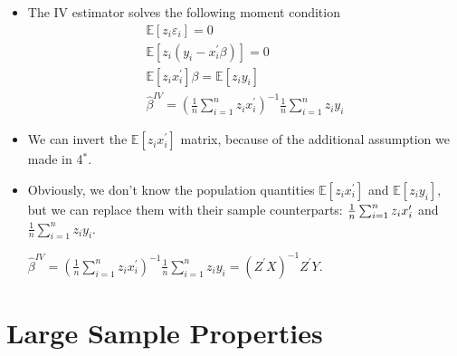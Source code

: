 \documentclass[notes=show]{beamer}
\begin{document}
\begin{frame}%


\begin{itemize}
\item The IV estimator solves the following moment condition%
\begin{gather*}
\mathbb{E}[z_{i}\varepsilon _{i}]=0 \\
\mathbb{E}[z_{i}(y_{i}-x_{i}^{\prime }\beta )]=0 \\
\mathbb{E}[z_{i}x_{i}^{\prime }]\beta =\mathbb{E}[z_{i}y_{i}] \\
\widehat{\beta }^{IV}=\left( \frac{1}{n}\sum_{i=1}^{n}z_{i}x_{i}^{\prime
}\right) ^{-1}\frac{1}{n}\sum_{i=1}^{n}z_{i}y_{i}
\end{gather*}

\item We can invert the $\mathbb{E}[z_{i}x_{i}^{\prime }]$ matrix, because
of the additional assumption we made in 4$^{\text{*}}$.

\item Obviously, we don't know the population quantities $\mathbb{E}%
[z_{i}x_{i}^{\prime }]$ and $\mathbb{E}[z_{i}y_{i}],$ but we can replace
them with their sample counterparts: $\frac{1}{n}\sum_{i=1}^{n}z_{i}x_{i}^{%
\prime }$ and $\frac{1}{n}\sum_{i=1}^{n}z_{i}y_{i}.$

$\widehat{\beta }^{IV}=\left( \frac{1}{n}\sum_{i=1}^{n}z_{i}x_{i}^{\prime
}\right) ^{-1}\frac{1}{n}\sum_{i=1}^{n}z_{i}y_{i}=\left( Z^{\prime }X\right)
^{-1}Z^{\prime }Y.$
\end{itemize}

\end{frame}%

\section{Large Sample Properties}
\end{document}
